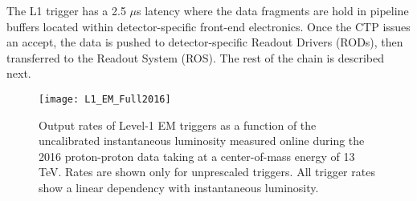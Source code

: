 The L1 trigger has a 2.5 $\mu$s latency where the data fragments are 
hold in pipeline buffers located within detector-specific front-end 
electronics. 
Once the CTP issues an accept, the data is pushed to detector-specific 
Readout Drivers (RODs), then transferred to the Readout System (ROS). 
The rest of the chain is described next. 

\begin{figure}[t!]
\centering
\texttt{[image: L1\_EM\_Full2016]}
\caption{Output rates of Level-1 EM triggers as a function of the uncalibrated instantaneous luminosity measured online during the 2016 proton-proton data taking at a center-of-mass energy of 13 TeV.
Rates are shown only for unprescaled triggers. All trigger rates show a linear dependency with instantaneous luminosity.}
\label{fig:}
\end{figure} 




